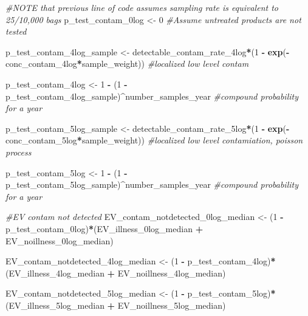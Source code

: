 \documentclass[
]{article}
\newenvironment{Shaded}{\begin{snugshade}}{\end{snugshade}}
\newcommand{\CommentTok}[1]{\textcolor[rgb]{0.56,0.35,0.01}{\textit{#1}}}
\newcommand{\DecValTok}[1]{\textcolor[rgb]{0.00,0.00,0.81}{#1}}
\newcommand{\FunctionTok}[1]{\textcolor[rgb]{0.13,0.29,0.53}{\textbf{#1}}}
\newcommand{\NormalTok}[1]{#1}
\newcommand{\OtherTok}[1]{\textcolor[rgb]{0.56,0.35,0.01}{#1}}
\newcommand{\SpecialCharTok}[1]{\textcolor[rgb]{0.81,0.36,0.00}{\textbf{#1}}}
\begin{document}
\begin{Shaded}
\begin{Highlighting}[]
\CommentTok{\#NOTE that previous line of code assumes sampling rate is equivalent to 25/10,000 bags}
\NormalTok{p\_test\_contam\_0log }\OtherTok{\textless{}{-}} \DecValTok{0} \CommentTok{\#Assume untreated products are not tested}

\NormalTok{p\_test\_contam\_4log\_sample }\OtherTok{\textless{}{-}}\NormalTok{ detectable\_contam\_rate\_4log}\SpecialCharTok{*}\NormalTok{(}\DecValTok{1} \SpecialCharTok{{-}} \FunctionTok{exp}\NormalTok{(}\SpecialCharTok{{-}}\NormalTok{conc\_contam\_4log}\SpecialCharTok{*}\NormalTok{sample\_weight)) }\CommentTok{\#localized low level contam }
  
\NormalTok{p\_test\_contam\_4log }\OtherTok{\textless{}{-}} \DecValTok{1} \SpecialCharTok{{-}}\NormalTok{ (}\DecValTok{1} \SpecialCharTok{{-}}\NormalTok{ p\_test\_contam\_4log\_sample)}\SpecialCharTok{\^{}}\NormalTok{number\_samples\_year }\CommentTok{\#compound probability for a year}

\NormalTok{p\_test\_contam\_5log\_sample }\OtherTok{\textless{}{-}}\NormalTok{ detectable\_contam\_rate\_5log}\SpecialCharTok{*}\NormalTok{(}\DecValTok{1} \SpecialCharTok{{-}} \FunctionTok{exp}\NormalTok{(}\SpecialCharTok{{-}}\NormalTok{conc\_contam\_5log}\SpecialCharTok{*}\NormalTok{sample\_weight)) }\CommentTok{\#localized low level contamiation, poisson process }

\NormalTok{p\_test\_contam\_5log }\OtherTok{\textless{}{-}} \DecValTok{1} \SpecialCharTok{{-}}\NormalTok{ (}\DecValTok{1} \SpecialCharTok{{-}}\NormalTok{ p\_test\_contam\_5log\_sample)}\SpecialCharTok{\^{}}\NormalTok{number\_samples\_year }\CommentTok{\#compound probability for a year}


\CommentTok{\#EV contam not detected}
\NormalTok{EV\_contam\_notdetected\_0log\_median }\OtherTok{\textless{}{-}}\NormalTok{ (}\DecValTok{1} \SpecialCharTok{{-}}\NormalTok{ p\_test\_contam\_0log)}\SpecialCharTok{*}\NormalTok{(EV\_illness\_0log\_median }\SpecialCharTok{+}\NormalTok{ EV\_noillness\_0log\_median)}

\NormalTok{EV\_contam\_notdetected\_4log\_median }\OtherTok{\textless{}{-}}\NormalTok{ (}\DecValTok{1} \SpecialCharTok{{-}}\NormalTok{ p\_test\_contam\_4log)}\SpecialCharTok{*}\NormalTok{(EV\_illness\_4log\_median }\SpecialCharTok{+}\NormalTok{ EV\_noillness\_4log\_median)}

\NormalTok{EV\_contam\_notdetected\_5log\_median }\OtherTok{\textless{}{-}}\NormalTok{ (}\DecValTok{1} \SpecialCharTok{{-}}\NormalTok{ p\_test\_contam\_5log)}\SpecialCharTok{*}\NormalTok{(EV\_illness\_5log\_median }\SpecialCharTok{+}\NormalTok{ EV\_noillness\_5log\_median)}


\end{Highlighting}
\end{Shaded}
\end{document}
